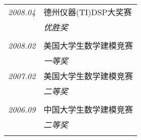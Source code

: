 \documentclass[paper=a4,fontsize=11pt]{scrartcl}
\begin{document}
\begin{tabular}{r|p{11cm}}

\emph{2008.04} & 德州仪器(TI)DSP大奖赛 \\
& \emph{优胜奖}\\
\multicolumn{2}{c}{} \\


\emph{2008.02} & 美国大学生数学建模竞赛\\
& \emph{一等奖}\\


\emph{2007.02} & 美国大学生数学建模竞赛\\
& \emph{二等奖}\\
\multicolumn{2}{c}{} \\


\emph{2006.09} & 中国大学生数学建模竞赛\\
& \emph{二等奖}\\
\multicolumn{2}{c}{} \\


\end{tabular}


%
%
%



\end{document}
